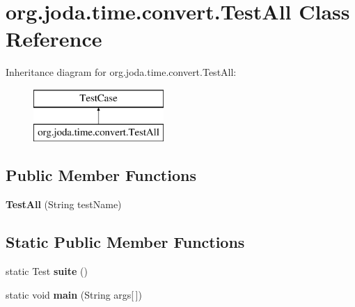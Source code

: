 \hypertarget{classorg_1_1joda_1_1time_1_1convert_1_1_test_all}{\section{org.\-joda.\-time.\-convert.\-Test\-All Class Reference}
\label{classorg_1_1joda_1_1time_1_1convert_1_1_test_all}
}
Inheritance diagram for org.\-joda.\-time.\-convert.\-Test\-All\-:\begin{figure}[H]
\begin{center}
\leavevmode
\includegraphics[height=2.000000cm]{classorg_1_1joda_1_1time_1_1convert_1_1_test_all}
\end{center}
\end{figure}
\subsection*{Public Member Functions}
\begin{DoxyCompactItemize}
\item 
\hypertarget{classorg_1_1joda_1_1time_1_1convert_1_1_test_all_afd4864cb43c5aaee9286284f6920a4e7}{{\bfseries Test\-All} (String test\-Name)}\label{classorg_1_1joda_1_1time_1_1convert_1_1_test_all_afd4864cb43c5aaee9286284f6920a4e7}

\end{DoxyCompactItemize}
\subsection*{Static Public Member Functions}
\begin{DoxyCompactItemize}
\item 
\hypertarget{classorg_1_1joda_1_1time_1_1convert_1_1_test_all_af8bcb85e786a8c17dfc2325f506d2858}{static Test {\bfseries suite} ()}\label{classorg_1_1joda_1_1time_1_1convert_1_1_test_all_af8bcb85e786a8c17dfc2325f506d2858}

\item 
\hypertarget{classorg_1_1joda_1_1time_1_1convert_1_1_test_all_ac423356ad33dcd364de5fc70fcbd6c18}{static void {\bfseries main} (String args\mbox{[}$\,$\mbox{]})}\label{classorg_1_1joda_1_1time_1_1convert_1_1_test_all_ac423356ad33dcd364de5fc70fcbd6c18}

\end{DoxyCompactItemize}


